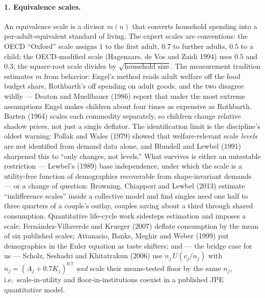 \documentclass[10pt]{article}
\begin{document}
\paragraph{1. Equivalence scales.}
An equivalence scale is a divisor $m(n)$ that converts household spending
into a per-adult-equivalent standard of living. The expert scales are
conventions: the OECD ``Oxford'' scale assigns $1$ to the first adult, $0.7$
to further adults, $0.5$ to a child; the OECD-modified scale (Hagenaars, de
Vos and Zaidi 1994) uses $0.5$ and $0.3$; the square-root scale divides by
$\sqrt{\text{household size}}$. The measurement tradition estimates $m$ from
behavior: Engel's method reads adult welfare off the food budget share,
Rothbarth's off spending on adult goods, and the two disagree wildly ---
Deaton and Muellbauer (1986) report that under the most extreme assumptions
Engel makes children about four times as expensive as Rothbarth. Barten
(1964) scales each commodity separately, so children change relative shadow
prices, not just a single deflator. The identification limit is the
discipline's oldest warning: Pollak and Wales (1979) showed that
welfare-relevant scale \emph{levels} are not identified from demand data
alone, and Blundell and Lewbel (1991) sharpened this to ``only changes, not
levels.'' What survives is either an untestable restriction --- Lewbel's
(1989) base independence, under which the scale is a utility-free function of
demographics recoverable from shape-invariant demands --- or a change of
question: Browning, Chiappori and Lewbel (2013) estimate ``indifference
scales'' inside a collective model and find singles need one half to three
quarters of a couple's outlay, couples saving about a third through shared
consumption. Quantitative life-cycle work sidesteps estimation and imposes a
scale: Fern\'andez-Villaverde and Krueger (2007) deflate consumption by the
mean of six published scales; Attanasio, Banks, Meghir and Weber (1999) put
demographics in the Euler equation as taste shifters; and --- the bridge case
for us --- Scholz, Seshadri and Khitatrakun (2006) use
$n_j\,U(c_j/n_j)$ with $n_j=(A_j+0.7K_j)^{0.7}$ \emph{and} scale their
means-tested floor by the same $n_j$, i.e.\ scale-in-utility and floor-in-institutions
coexist in a published JPE quantitative model.
\end{document}
